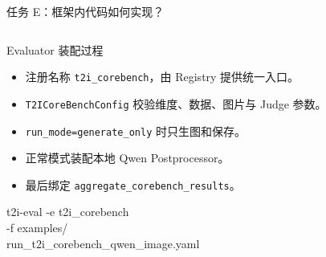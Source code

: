 \documentclass[aspectratio=169,10pt]{beamer}
\begin{document}
\begin{frame}{任务 E：框架内代码如何实现？}
\begin{columns}[T,onlytextwidth]
      \begin{block}{Evaluator 装配过程}
        \begin{minipage}[c][5.0cm][c]{\linewidth}
          \begin{itemize}\scriptsize
            \item 注册名称 \texttt{t2i\_corebench}，由 Registry 提供统一入口。
            \item \texttt{T2ICoreBenchConfig} 校验维度、数据、图片与 Judge 参数。
            \item \texttt{run\_mode=generate\_only} 时只生图和保存。
            \item 正常模式装配本地 Qwen Postprocessor。
            \item 最后绑定 \texttt{aggregate\_corebench\_results}。
          \end{itemize}
          \vspace{0.4em}
          \tiny\ttfamily
          t2i-eval -e t2i\_corebench\\
          -f examples/\\
          run\_t2i\_corebench\_qwen\_image.yaml
        \end{minipage}
      \end{block}
  \end{columns}
\end{frame}
\end{document}
